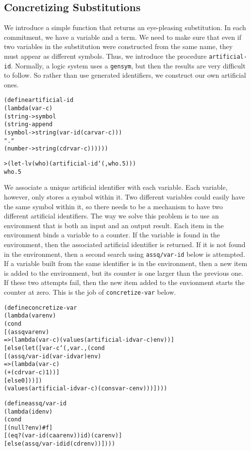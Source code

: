 \subsection{Concretizing Substitutions}

We introduce a simple function that returns an eye-pleasing
substitution.  In each commitment, we have a variable and a term.  We
need to make sure that even if two variables in the substitution were
constructed from the same name, they must appear as different symbols.
Thus, we introduce the procedure \texttt{artificial-id}.  Normally, a
logic system uses a \texttt{gensym}, but then the results are very
difficult to follow.  So rather than use generated identifiers, we
construct our own artificial ones.

\begin{alltt}
(define artificial-id
  (lambda (var-c)
    (string->symbol
      (string-append
        (symbol->string (var-id (car var-c)))
        "."
        (number->string (cdr var-c))))))

> (let-lv (who) (artificial-id `(,who . 5)))
who.5
\end{alltt}

We associate a unique artificial identifier with each variable.  Each
variable, however, only stores a symbol within it.  Two different
variables could easily have the same symbol within it, so there needs
to be a mechanism to have two different artificial identifiers.  The
way we solve this problem is to use an environment that is both an
input and an output result.  Each item in the environment binds a
variable to a counter.  If the variable is found in the environment,
then the associated artificial identifier is returned.  If it is not
found in the environment, then a second search using
\texttt{assq/var-id} below is attempted.  If a variable built from the
same identifier is in the environment, then a new item is added to the
environment, but its counter is one larger than the previous one. If
these two attempts fail, then the new item added to the envionment
starts the counter at zero.  This is the job of \texttt{concretize-var} below.

\begin{alltt}
(define concretize-var
  (lambda (var env)
    (cond
      [(assq var env)
       => (lambda (var-c) (values (artificial-id var-c) env))]
      [else (let ([var-c `(,var . ,(cond
                                     [(assq/var-id (var-id var) env)
                                      => (lambda (var-c)
                                           (+ (cdr var-c) 1))]
                                     [else 0]))])
              (values (artificial-id var-c) (cons var-c env)))])))
\end{alltt}
\begin{alltt}
(define assq/var-id
  (lambda (id env)
    (cond
      [(null? env) #f]
      [(eq? (var-id (caar env)) id) (car env)]
      [else (assq/var-id id (cdr env))])))
\end{alltt}

